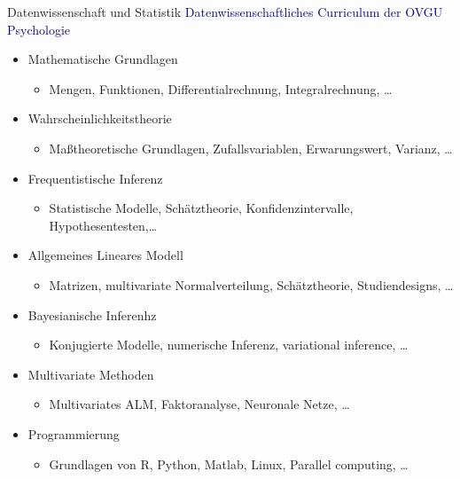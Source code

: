 \documentclass[
  8pt,
  ignorenonframetext,
]{beamer}
\providecommand{\tightlist}{%
  \setlength{\itemsep}{0pt}\setlength{\parskip}{0pt}}
\begin{document}
\begin{frame}{Datenwissenschaft und Statistik}
\protect\hypertarget{datenwissenschaft-und-statistik-15}{}
\textcolor{darkblue}{Datenwissenschaftliches Curriculum der OVGU Psychologie}


\begin{itemize}
\tightlist
\item
  Mathematische Grundlagen

  \begin{itemize}
  \tightlist
  \item
    Mengen, Funktionen, Differentialrechnung, Integralrechnung, \ldots{}
  \end{itemize}
\item
  Wahrscheinlichkeitstheorie

  \begin{itemize}
  \tightlist
  \item
    Maßtheoretische Grundlagen, Zufallsvariablen, Erwarungswert,
    Varianz, \ldots{}
  \end{itemize}
\item
  Frequentistische Inferenz

  \begin{itemize}
  \tightlist
  \item
    Statistische Modelle, Schätztheorie, Konfidenzintervalle,
    Hypothesentesten,\ldots{}
  \end{itemize}
\item
  Allgemeines Lineares Modell

  \begin{itemize}
  \tightlist
  \item
    Matrizen, multivariate Normalverteilung, Schätztheorie,
    Studiendesigns, \ldots{}
  \end{itemize}
\item
  Bayesianische Inferenhz

  \begin{itemize}
  \tightlist
  \item
    Konjugierte Modelle, numerische Inferenz, variational inference,
    \ldots{}
  \end{itemize}
\item
  Multivariate Methoden

  \begin{itemize}
  \tightlist
  \item
    Multivariates ALM, Faktoranalyse, Neuronale Netze, \ldots{}\\
  \end{itemize}
\item
  Programmierung

  \begin{itemize}
  \tightlist
  \item
    Grundlagen von R, Python, Matlab, Linux, Parallel computing,
    \ldots{}
  \end{itemize}
\end{itemize}
\end{frame}
\end{document}
